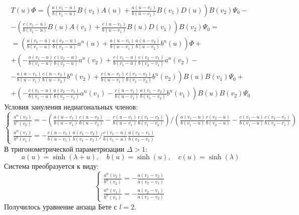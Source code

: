 \documentclass[12pt]{article}
\theoremstyle{definition}
\begin{document}
\begin{enumerate}
\begin{multline}
        T(u)\Phi=\left(\frac{a(v_1-u)}{b(v_1-u)}B(v_1)A(u)+\frac{a(u-v_1)}{b(u-v_1)}B(v_1)D(u)\right)B(v_2)\Psi_0-\\-\left(\frac{c(v_1-u)}{b(v_1-u)}B(u)A(v_1)+\frac{c(u-v_1)}{b(u-v_1)}B(u)D(v_1)\right)B(v_2)\Psi_0=\\=\left(\frac{a(v_1-u)}{b(v_1-u)}\frac{a(v_2-u)}{b(v_2-u)}a^n(u)+\frac{a(u-v_1)}{b(u-v_1)}\frac{a(u-v_2)}{b(u-v_2)}b^n(u)\right)\Phi+\\+\left(-\frac{a(v_1-u)}{b(v_1-u)}\frac{c(v_2-u)}{b(v_2-u)}a^n(v_2)+\frac{c(v_1-u)}{b(v_1-u)}\frac{c(v_2-v_1)}{b(v_2-v_1)}a^n(v_2)-\right.\\\left.-\frac{a(u-v_1)}{b(u-v_1)}\frac{c(u-v_2)}{b(u-v_2)}b^n(v_2)+\frac{c(u-v_1)}{b(u-v_1)}\frac{c(v_1-v_2)}{b(v_1-v_2)}b^n(v_2)\right)B(u)B(v_1)\Psi_0+\\+\left(-\frac{c(v_1-u)}{b(v_1-u)}\frac{a(v_2-v_1)}{b(v_2-v_1)}a^n(v_1)-\frac{c(u-v_1)}{b(u-v_1)}\frac{a(v_1-v_2)}{b(v_1-v_2)}b^n(v_1)\right)B(u)B(v_2)\Psi_0
    \end{multline}
    Условия зануления недиагональных членов:
    \begin{equation}
        \begin{cases}
            \frac{a^n(v_2)}{b^n(v_2)}=-\left(\frac{a(u-v_1)}{b(u-v_1)}\frac{c(u-v_2)}{b(u-v_2)}-\frac{c(u-v_1)}{b(u-v_1)}\frac{c(v_1-v_2)}{b(v_1-v_2)}\right)/\left(\frac{a(v_1-u)}{b(v_1-u)}\frac{c(v_2-u)}{b(v_2-u)}-\frac{c(v_1-u)}{b(v_1-u)}\frac{c(v_2-v_1)}{b(v_2-v_1)}\right)\\
            \frac{a^n(v_1)}{b^n(v_1)}=-\frac{c(u-v_1)}{b(u-v_1)}\frac{a(v_1-v_2)}{b(v_1-v_2)}/\frac{c(v_1-u)}{b(v_1-u)}\frac{a(v_2-v_1)}{b(v_2-v_1)}
        \end{cases}
    \end{equation}
    В тригонометрической параметризации $\Delta>1$:
    \begin{equation}
        a(u)=\sinh(\lambda+u),\quad b(u)=\sinh(u),\quad c(u)=\sinh(\lambda)
    \end{equation}
    Система преобразуется к виду:
    \begin{equation}
        \begin{cases}
            \frac{a^n(v_2)}{b^n(v_2)}=-\frac{a(v_1-v_2)}{a(v_2-v_1)}\\
            \frac{a^n(v_1)}{b^n(v_1)}=-\frac{a(v_2-v_1)}{a(v_1-v_2)}
        \end{cases}
    \end{equation}
    Получилось уравнение анзаца Бете с $l=2$.\\

\end{enumerate}
\end{document}
